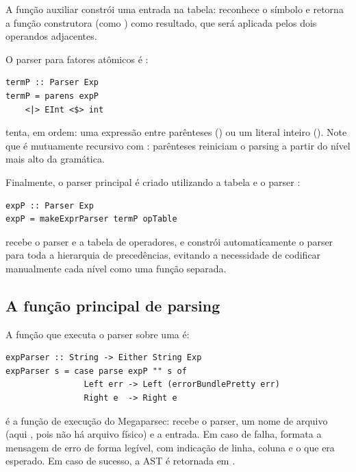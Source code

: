 A função auxiliar  constrói uma
entrada na tabela: 
reconhece o símbolo  e retorna a função
construtora  (como \haskell{(:*:)}) como
resultado, que será aplicada pelos dois operandos adjacentes.

O parser para fatores atômicos é :

\begin{verbatim}
termP :: Parser Exp
termP = parens expP
    <|> EInt <$> int
\end{verbatim}

 tenta, em ordem: uma expressão entre
parênteses () ou um literal
inteiro (). Note que
 é mutuamente recursivo com
: parênteses reiniciam o parsing a
partir do nível mais alto da gramática.

Finalmente, o parser principal é criado utilizando a tabela e o
parser :

\begin{verbatim}
expP :: Parser Exp
expP = makeExprParser termP opTable
\end{verbatim}

 recebe o parser
 e a tabela de operadores, e constrói
automaticamente o parser para toda a hierarquia de precedências,
evitando a necessidade de codificar manualmente cada nível como uma
função separada.

\subsection{A função principal de parsing}

A função que executa o parser 
sobre uma  é:

\begin{verbatim}
expParser :: String -> Either String Exp
expParser s = case parse expP "" s of
                Left err -> Left (errorBundlePretty err)
                Right e  -> Right e
\end{verbatim}

 é a função de execução do Megaparsec:
recebe o parser, um nome de arquivo (aqui
, pois não há arquivo físico) e a
entrada. Em caso de falha,
 formata a mensagem de
erro de forma legível, com indicação de linha, coluna e o que era
esperado. Em caso de sucesso, a AST é retornada em
.

